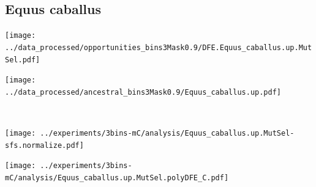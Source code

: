 \subsection{Equus caballus}

\begin{minipage}{0.49\linewidth}
    \texttt{[image: ../data\_processed/opportunities\_bins3Mask0.9/DFE.Equus\_caballus.up.MutSel.pdf]}
\end{minipage}
\begin{minipage}{0.49\linewidth}
    \texttt{[image: ../data\_processed/ancestral\_bins3Mask0.9/Equus\_caballus.up.pdf]}
\end{minipage}
\\
\begin{minipage}{0.49\linewidth}
    \texttt{[image: ../experiments/3bins-mC/analysis/Equus\_caballus.up.MutSel-sfs.normalize.pdf]}
\end{minipage}
\begin{minipage}{0.4\linewidth}
    \texttt{[image: ../experiments/3bins-mC/analysis/Equus\_caballus.up.MutSel.polyDFE\_C.pdf]}
\end{minipage}

